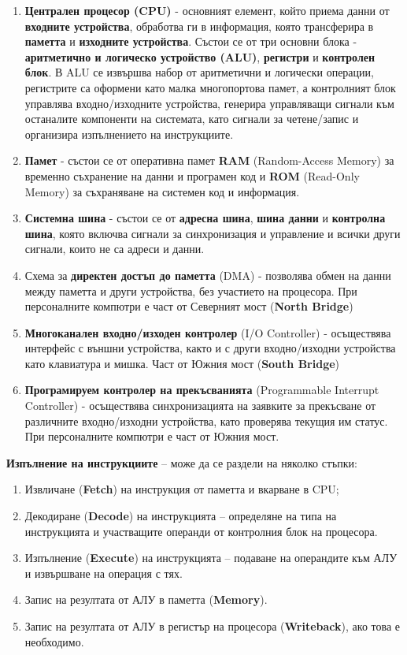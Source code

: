 \documentclass{article}
\begin{document}
\begin{enumerate}
    \item \textbf{Централен процесор (CPU)} - основният елемент, който приема данни от \textbf{входните устройства},
обработва ги в информация, която трансферира в \textbf{паметта} и \textbf{изходните устройства}. Състои се от
три основни блока - \textbf{аритметично и логическо устройство (ALU)}, \textbf{регистри} и \textbf{контролен блок}.
В ALU се извършва набор от аритметични и логически операции, регистрите са оформени като малка многопортова памет,
а контролният блок управлява входно/изходните устройства, генерира управляващи сигнали към останалите компоненти
на системата, като сигнали за четене/запис и организира изпълнението на инструкциите.
    \item \textbf{Памет} - състои се от оперативна памет \textbf{RAM} (Random-Access Memory) за временно съхранение
на данни и програмен код и \textbf{ROM} (Read-Only Memory) за съхраняване на системен код и информация.
    \item \textbf{Системна шина} - състои се от \textbf{адресна шина}, \textbf{шина данни} и \textbf{контролна шина},
която включва сигнали за синхронизация и управление и всички други сигнали, които не са адреси и данни.
    \item Схема за \textbf{директен достъп до паметта} (DMA) - позволява обмен на данни между паметта и други
устройства, без участието на процесора. При персоналните компютри е част от Северният мост (\textbf{North Bridge})
    \item \textbf{Многоканален входно/изходен контролер} (I/O Controller) - осъществява интерфейс с външни устройства, както и
с други входно/изходни устройства като клавиатура и мишка. Част от Южния мост (\textbf{South Bridge})
    \item \textbf{Програмируем контролер на прекъсванията} (Programmable Interrupt Controller) - осъществява синхронизацията на
заявките за прекъсване от различните входно/изходни устройства, като проверява текущия им статус. При персоналните
компютри е част от Южния мост.
\end{enumerate}
\textbf{Изпълнение на инструкциите} – може да се раздели на няколко стъпки:
\begin{enumerate}
    \item Извличане (\textbf{Fetch}) на инструкция от паметта и вкарване в CPU;
    \item Декодиране (\textbf{Decode}) на инструкцията – определяне на типа на инструкцията и участващите операнди от контролния блок на процесора.
    \item Изпълнение (\textbf{Execute}) на инструкцията – подаване на операндите към АЛУ и извършване на операция с тях.
    \item Запис на резултата от АЛУ в паметта (\textbf{Memory}).
    \item Запис на резултата от АЛУ в регистър на процесора (\textbf{Writeback}), ако това е необходимо.
\end{enumerate}
\end{document}
